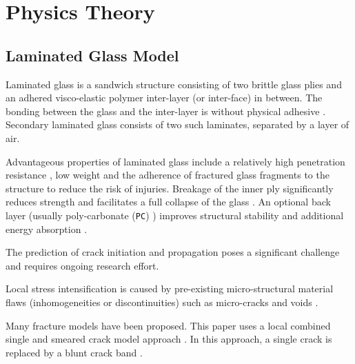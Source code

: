 \documentclass[format=acmtog,12pt,screen=true,review=false,natbib=false,]{acmart}
\begin{document}
\maketitle

\section{Physics Theory}
\label{sec:PhysicsTheory}

\subsection{Laminated Glass Model}


Laminated glass is a sandwich structure consisting of two brittle glass plies and an adhered visco-elastic polymer inter-layer (or inter-face) in between. The bonding between the glass and the inter-layer is without physical adhesive \cite{Sam19}. Secondary laminated glass consists of two such laminates, separated by a layer of air.

\bigbreak
Advantageous properties of laminated glass include a relatively high penetration resistance \cite{Xu14}, low weight \cite{Wu14} and the adherence of fractured glass fragments to the structure to reduce the risk of injuries\cite{Xu14, Che17, Flo98, Ji98}. Breakage of the inner ply significantly reduces strength and facilitates a full collapse of the glass \cite{Flo98}. An optional back layer (usually poly-carbonate (\texttt{PC}) \cite{Bra10, Mon04}) improves structural stability and additional energy absorption \cite{Bio10, Bra10}.

\bigbreak
The prediction of crack initiation and propagation poses a significant challenge and requires ongoing research effort. 

\bigbreak
Local stress intensification is caused by pre-existing micro-structural material flaws (inhomogeneities or discontinuities) such as micro-cracks and voids \cite{Sch12}. 

\bigbreak
Many fracture models have been proposed. This paper uses a local combined single and smeared crack model approach \cite{Mun99, Lat15}. In this approach, a single crack is replaced by a blunt crack band \cite{Mun04}.
\end{document}
